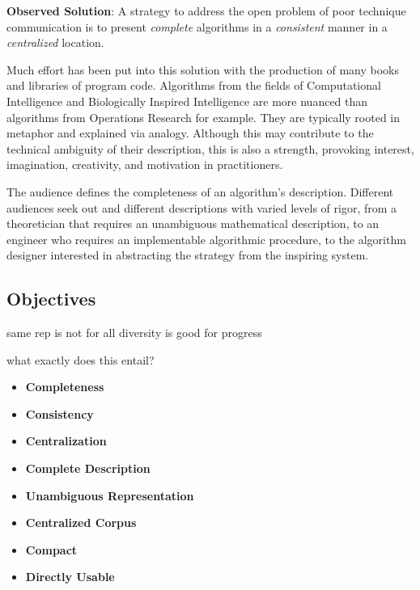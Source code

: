 \documentclass[a4paper, 11pt]{article}
\begin{document}
\textbf{Observed Solution}: A strategy to address the open problem of poor technique communication is to present \emph{complete} algorithms in a \emph{consistent} manner in a \emph{centralized} location. 

Much effort has been put into this solution with the production of many books and libraries of program code. Algorithms from the fields of Computational Intelligence and Biologically Inspired Intelligence are more nuanced than algorithms from Operations Research for example. They are typically rooted in metaphor and explained via analogy. Although this may contribute to the technical ambiguity of their description, this is also a strength, provoking interest, imagination, creativity, and motivation in practitioners. 

The audience defines the completeness of an algorithm's description. Different audiences seek out and different descriptions with varied levels of rigor, from a theoretician that requires an unambiguous mathematical description, to an engineer who requires an implementable algorithmic procedure, to the algorithm designer interested in abstracting the strategy from the inspiring system. 


\subsection{Objectives}

same rep is not for all
diversity is good for progress

what exactly does this entail?

\begin{itemize}
	\item \textbf{Completeness}
	\item \textbf{Consistency}
	\item \textbf{Centralization}
\end{itemize}

\begin{itemize}
	\item \textbf{Complete Description}
	\item \textbf{Unambiguous Representation}
	\item \textbf{Centralized Corpus}
	\item \textbf{Compact}
	\item \textbf{Directly Usable}
\end{itemize}
\end{document}
